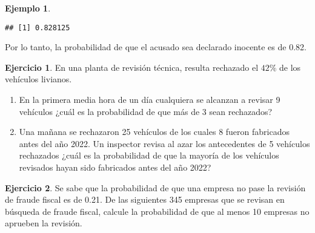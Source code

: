 \documentclass[
]{book}
\providecommand{\tightlist}{%
  \setlength{\itemsep}{0pt}\setlength{\parskip}{0pt}}
\theoremstyle{definition}
\theoremstyle{definition}
\newtheorem{example}{Ejemplo}[chapter]
\theoremstyle{definition}
\newtheorem{exercise}{Ejercicio}[chapter]
\theoremstyle{definition}
\theoremstyle{remark}
\begin{document}
\begin{example}
\begin{verbatim}
## [1] 0.828125
\end{verbatim}

Por lo tanto, la probabilidad de que el acusado sea declarado inocente es de 0.82.
\end{example}

\begin{exercise}

En una planta de revisión técnica, resulta rechazado el \(42 \%\) de los vehículos livianos.

\begin{enumerate}
\def\labelenumi{\arabic{enumi}.}
\tightlist
\item
  En la primera media hora de un día cualquiera se alcanzan a revisar 9 vehículos ¿cuál es la probabilidad de que más de 3 sean rechazados?
\item
  Una mañana se rechazaron 25 vehículos de los cuales 8 fueron fabricados antes del año 2022. Un inspector revisa al azar los antecedentes de 5 vehículos rechazados ¿cuál es la probabilidad de que la mayoría de los vehículos revisados hayan sido fabricados antes del año 2022?
\end{enumerate}

\end{exercise}

\begin{exercise}
Se sabe que la probabilidad de que una empresa no pase la revisión de fraude fiscal es de 0.21. De las siguientes 345 empresas que se revisan en búsqueda de fraude fiscal, calcule la probabilidad de que al menos 10 empresas no aprueben la revisión.
\end{exercise}
\end{document}
